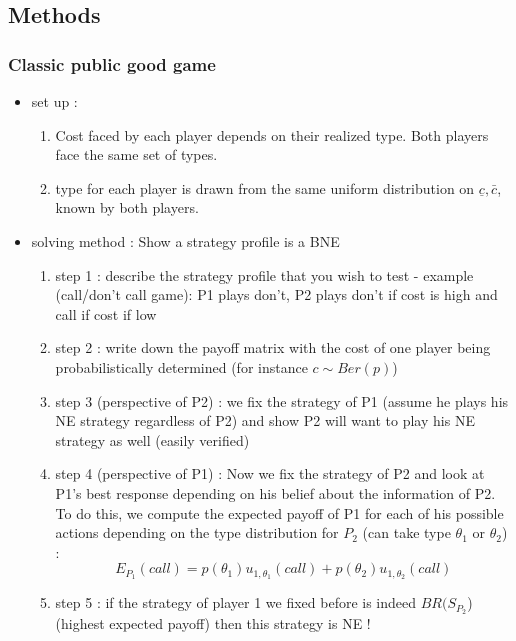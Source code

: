 \documentclass{article}
\begin{document}
\subsection{Methods}

\subsubsection{Classic public good game}
\begin{itemize}
    \item set up :
    \begin{enumerate}
        \item Cost faced by each player depends on their realized type. Both players face the same set of types. 
        \item type for each player is drawn from the same uniform distribution on $\underline{c},\bar{c}$, known by both players. 
    \end{enumerate}
    \item solving method : Show a strategy profile is a BNE
    \begin{enumerate}
        \item step 1 : describe the strategy profile  that you wish to test
        \subitem - example (call/don't call game): P1 plays don't, P2 plays don't if cost is high and call if cost if low
        \item step 2 : write down the payoff matrix with the cost of one player being probabilistically determined (for instance $c\sim Ber(p) $)
        \item step 3 (perspective of P2) : we fix the strategy of P1 (assume he plays his NE strategy regardless of P2) and show P2 will want to play his NE strategy as well (easily verified)
        \item step 4 (perspective of P1) : Now we fix the strategy of P2 and look at P1's best response depending on his belief about the information of P2. To do this, we compute the expected payoff of P1 for each of his possible actions depending on the type distribution for $P_2$ (can take type $\theta_1$ or $\theta_2$) :  
        \begin{equation}
            E_{P_1}(call) = p(\theta_1)u_{1,\theta_1}(call) + p(\theta_2)u_{1,\theta_2}(call)
        \end{equation}
        \item step 5 : if the strategy of player 1 we fixed before is indeed $BR(S_{P_2}$) (highest expected payoff) then this strategy is NE ! 
    \end{enumerate}

\end{itemize}
\end{document}
